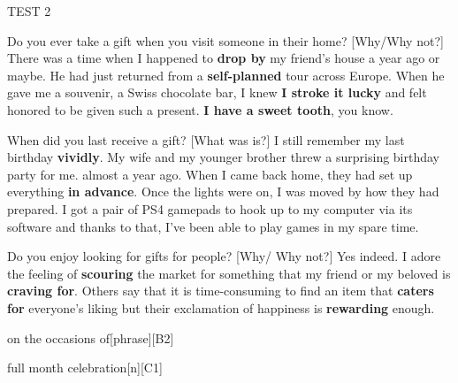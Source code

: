 \begin{glossarymc}[Cambridge 9]
\begin{test}{TEST 2}
    \begin{qa}{Do you ever take a gift when you visit someone in their home? [Why/Why not?]}
    There was a time when I happened to \textbf{drop by} my friend's house a year ago or maybe. He had just returned from a \textbf{self-planned} tour across Europe. When he gave me a souvenir, a Swiss chocolate bar, I knew \textbf{I stroke it lucky} and felt honored to be given such a present. \textbf{I have a sweet tooth}, you know.
    \end{qa}

    \begin{qa}{When did you last receive a gift? [What was is?]}
    I still remember my last birthday \textbf{vividly}. My wife and my younger brother threw a surprising birthday party for me. almost a year ago. When I came back home, they had set up everything \textbf{in advance}. Once the lights were on, I was moved by how they had prepared. I got a pair of PS4 gamepads to hook up to my computer via its software and thanks to that, I've been able to play games in my spare time.
    \end{qa}

    \begin{qa}{Do you enjoy looking for gifts for people? [Why/ Why not?]}
    Yes indeed. I adore the feeling of \textbf{scouring} the market for something that my friend or my beloved is \textbf{craving for}. Others say that it is time-consuming to find an item that \textbf{caters for} everyone's liking but their exclamation of happiness is \textbf{rewarding} enough.
    \end{qa}

        \begin{VocabExplain}[Part 1]
            \begin{ExplainCard}{on the occasions of}[phrase][B2]
            \end{ExplainCard}

            \begin{ExplainCard}{full month celebration}[n][C1]
            \end{ExplainCard}


\end{VocabExplain}
\end{test}
\end{glossarymc}
